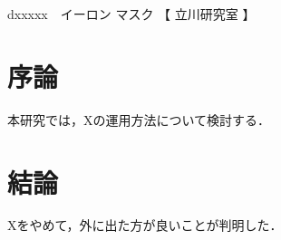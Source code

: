 \documentclass[uplatex]{jsarticle}
\begin{document}
    \begin{center}
        \fontsize{14.5truept}{14.5truept}

        \vspace{19pt}

        {\large dxxxxx　イーロン マスク 【 立川研究室 】}

        \vspace{8pt}
    \end{center}

    \begin{multicols}{2}
        \section{序論}
        
        本研究では，Xの運用方法について検討する．

        \section{結論}

        Xをやめて，外に出た方が良いことが判明した．

        \newpage
    \end{multicols}
\end{document}
